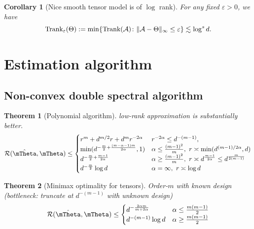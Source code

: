 \documentclass[11pt]{article}
\theoremstyle{plain}
\newtheorem{thm}{Theorem}[section]
\newtheorem{cor}{Corollary}
\theoremstyle{definition}
\def\rank{\textup{Trank}}
\begin{document}
\begin{cor}[Nice smooth tensor model is of $\log$ rank] For any fixed $\varepsilon>0$, we have
\[
\rank_{\varepsilon}(\Theta):=\min\{\rank(\tA)\colon \mnormSize{}{\tA-\Theta}\leq \varepsilon\}\lesssim \log^s d.
\]
\end{cor}


\section{Estimation algorithm}


\subsection{Non-convex double spectral algorithm}

\begin{thm}[Polynomial algorithm] low-rank approximation is substantially better. 
\begin{align}
\tR(\hat \mTheta,\mTheta)\leq
\begin{cases}
r^{m}+d^{m/2}r+d^mr^{-2\alpha}& r^{-2\alpha}\leq d^{-(m-1)},\\
\min(d^{{-{m\over 2}+{(m-\alpha-1)m\over 2\alpha}}},1) &  \alpha\leq {(m-1)^2\over m},\ r\asymp \min(d^{(m-1)/2\alpha},d)\\
d^{-{{m\over 2}+{m-1\over 2\alpha}}}& \alpha\geq {(m-1)^2\over m}, \ r\asymp  d^{m-1\over 2\alpha}\leq d^{m\over 2(m-1)}\\
d^{-{m\over 2}}\log d & \alpha=\infty, \ r\asymp \log d
\end{cases}
\end{align}
\end{thm}

\begin{thm}[Minimax optimality for tensors] 
Order-$m$ with known design (bottleneck: truncate at $d^{-(m-1)}$ with unknown design)
\begin{align}
\tR(\hat \mTheta,\mTheta)\leq
\begin{cases}
d^{-{2\alpha m \over m+2\alpha}} & \alpha\leq {m(m-1)\over 2}\\
d^{-{(m-1)}}\log d& \alpha\geq {m(m-1)\over 2}
\end{cases}
\end{align}
\end{thm}




\newpage
\appendix
\end{document}
